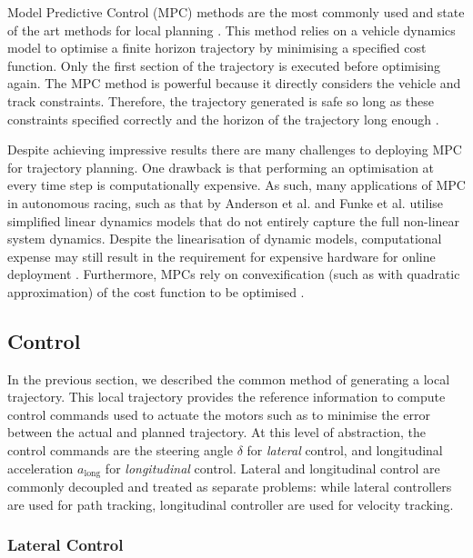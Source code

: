 Model Predictive Control (MPC) methods are the most commonly used and state of the art methods for local planning \cite{Betz2021}. 
This method relies on a vehicle dynamics model to optimise a finite horizon trajectory by minimising a specified cost function.
Only the first section of the trajectory is executed before optimising again.
The MPC method is powerful because it directly considers the vehicle and track constraints.
Therefore, the trajectory generated is safe so long as these constraints specified correctly and the horizon of the trajectory long enough \cite{Schwenzer2021}.

Despite achieving impressive results there are many challenges to deploying MPC for trajectory planning.
One drawback is that performing an optimisation at every time step is computationally expensive.
As such, many applications of MPC in autonomous racing, such as that by  Anderson et al. \cite{Anderson2016} and Funke et al. \cite{Funke2017} utilise simplified linear dynamics models that do not entirely capture the full non-linear system dynamics.
Despite the linearisation of dynamic models, computational expense may still result in the requirement for expensive hardware for online deployment \cite{Pan2017a}.
Furthermore, MPCs rely on convexification (such as with quadratic approximation) of the cost function to be optimised \cite{Williams2017}.


\subsection{Control}
\label{sec:control}

In the previous section, we described the common method of generating a local trajectory.
This local trajectory provides the reference information to compute control commands used to actuate the motors such as to minimise the error between the actual and planned trajectory.
At this level of abstraction, the control commands are the steering angle $\delta$ for \emph{lateral} control, and longitudinal acceleration $a_{\text{long}}$ for \emph{longitudinal} control.
Lateral and longitudinal control are commonly decoupled and treated as separate problems:
while lateral controllers are used for path tracking, longitudinal controller are used for velocity tracking.

\subsubsection*{Lateral Control}

